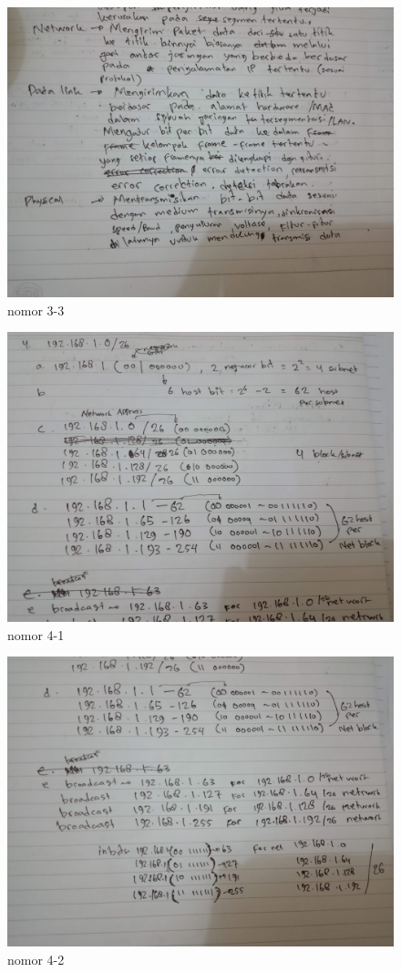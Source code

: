 \documentclass{article}
\begin{document}
  \begin{figure}
    \centering
    \includegraphics[width=\textwidth]{3-3.jpeg}
    \caption{nomor 3-3}
  \end{figure}
  \begin{figure}
    \centering
    \includegraphics[width=\textwidth]{4-1.jpeg}
    \caption{nomor 4-1}
  \end{figure}
  \begin{figure}
    \centering
    \includegraphics[width=\textwidth]{4-2.jpeg}
    \caption{nomor 4-2}
  \end{figure}
\end{document}
